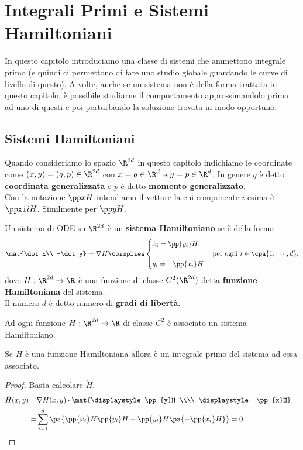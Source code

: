 \chapter{Integrali Primi e Sistemi Hamiltoniani}
In questo capitolo introduciamo una classe di sistemi che ammettono integrale primo (e quindi ci permettono di fare uno studio globale guardando le curve di livello di questo). A volte, anche se un sistema non \`e della forma trattata in questo capitolo, \`e possibile studiarne il comportamento approssimandolo prima ad uno di questi e poi perturbando la soluzione trovata in modo opportuno.
\section{Sistemi Hamiltoniani}
\begin{notation}
Quando consideriamo lo spazio $\R^{2d}$ in questo capitolo indichiamo le coordinate come $(x,y)=(q,p)\in\R^{2d}$ con $x=q\in\R^d$ e $y=p\in\R^d$. In genere $q$ \`e detto \textbf{coordinata generalizzata} e $p$ \`e detto \textbf{momento generalizzato}.\\
Con la notazione $\pp xH$ intendiamo il vettore la cui componente $i$-esima \`e $\ppxi iH$. Similmente per $\pp yH$.
\end{notation}
\begin{definition}
Un sistema di ODE su $\R^{2d}$ \`e un \textbf{sistema Hamiltoniano} se \`e della forma
\[\mat{\dot x\\ -\dot y}=\nabla H\coimplies \begin{cases}
\displaystyle \dot x_i=\pp{y_i}H\\\\
\displaystyle \dot y_i=-\pp{x_i}H
\end{cases}\text{per ogni }i\in\cpa{1,\cdots,d},\]
dove $H:\R^{2d}\to\R$ \`e una funzione di classe $C^2(\R^{2d})$ detta \textbf{funzione Hamiltoniana} del sistema.\\
Il numero $d$ \`e detto numero di \textbf{gradi di libert\`a}.
\end{definition}
\begin{remark}
Ad ogni funzione $H:\R^{2d}\to\R$ di classe $C^2$ \`e associato un sistema Hamiltoniano.
\end{remark}

\begin{proposition}\label{HamiltonianaEIntegralePrimo}
Se $H$ \`e una funzione Hamiltoniana allora \`e un integrale primo del sistema ad essa associato.
\end{proposition}
\begin{proof}
Basta calcolare $\dot H$.
\begin{align*}
\dot H(x,y)=&\nabla H(x,y)\cdot \mat{\displaystyle \pp {y}H \\\\ \displaystyle -\pp {x}H}=\\
=&\sum_{i=1}^d\pa{\pp{x_i}H\pp{y_i}H+\pp{y_i}H\pa{-\pp{x_i}H}}=0.
\end{align*}
\end{proof}

